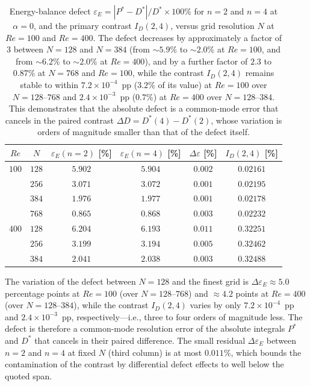 \begin{table}[!htbp]
\centering
\caption{Energy-balance defect $\varepsilon_E = |P^*-D^*|/D^* \times 100\%$ for $n=2$ and $n=4$ at $\alpha=0$, and the primary contrast $I_D(2,4)$, versus grid resolution $N$ at $Re=100$ and $Re=400$. The defect decreases by approximately a factor of 3 between $N=128$ and $N=384$ (from $\sim5.9\%$ to $\sim2.0\%$ at $Re=100$, and from $\sim6.2\%$ to $\sim2.0\%$ at $Re=400$), and by a further factor of $2.3$ to $0.87\%$ at $N=768$ and $Re=100$, while the contrast $I_D(2,4)$ remains stable to within $7.2\times10^{-4}$~pp ($3.2\%$ of its value) at $Re=100$ over $N=128$--$768$ and $2.4\times10^{-3}$~pp ($0.7\%$) at $Re=400$ over $N=128$--$384$. This demonstrates that the absolute defect is a common-mode error that cancels in the paired contrast $\Delta D = D^*(4)-D^*(2)$, whose variation is orders of magnitude smaller than that of the defect itself.}
\label{supptab:defect_vs_contrast}
\begin{tabular}{@{}c|c|cc|cc@{}}
\hline
$Re$ & $N$ & $\varepsilon_E(n{=}2)$ [\%] & $\varepsilon_E(n{=}4)$ [\%] & $\Delta\varepsilon$ [\%] & $I_D(2,4)$ [\%] \\
\hline
$100$ & $128$ & $5.902$ & $5.904$ & $0.002$ & $0.02161$ \\
      & $256$ & $3.071$ & $3.072$ & $0.001$ & $0.02195$ \\
      & $384$ & $1.976$ & $1.977$ & $0.001$ & $0.02178$ \\
      & $768$ & $0.865$ & $0.868$ & $0.003$ & $0.02232$ \\
\hline
$400$ & $128$ & $6.204$ & $6.193$ & $0.011$ & $0.32251$ \\
      & $256$ & $3.199$ & $3.194$ & $0.005$ & $0.32462$ \\
      & $384$ & $2.041$ & $2.038$ & $0.003$ & $0.32488$ \\
\hline
\end{tabular}
\end{table}

The variation of the defect between $N=128$ and the finest grid is $\Delta\varepsilon_E \approx 5.0$ percentage points at $Re=100$ (over $N=128$--$768$) and $\approx 4.2$ points at $Re=400$ (over $N=128$--$384$), while the contrast $I_D(2,4)$ varies by only $7.2\times10^{-4}$~pp and $2.4\times10^{-3}$~pp, respectively---i.e., three to four orders of magnitude less. The defect is therefore a common-mode resolution error of the absolute integrals $P^*$ and $D^*$ that cancels in their paired difference. The small residual $\Delta\varepsilon_E$ between $n=2$ and $n=4$ at fixed $N$ (third column) is at most $0.011\%$, which bounds the contamination of the contrast by differential defect effects to well below the quoted span.

